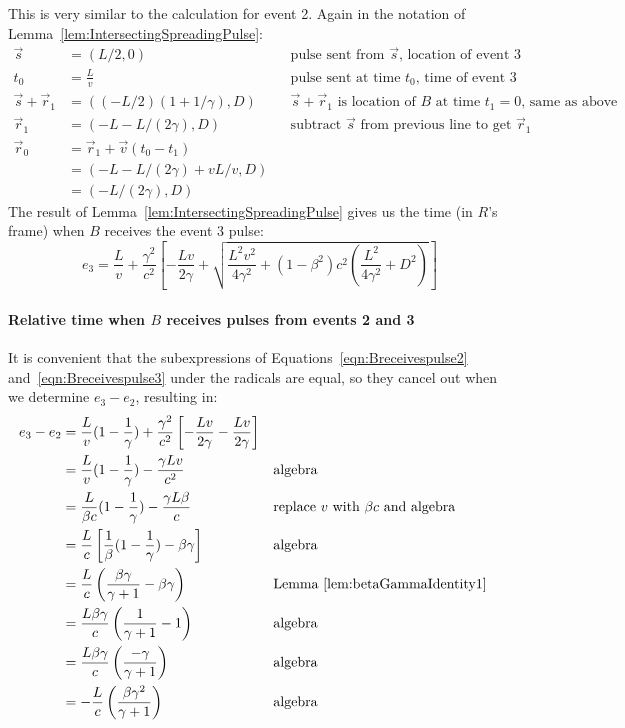 \documentclass[a4paper]{article}
\theoremstyle{plain}
\theoremstyle{definition}
\newcommand{\vect}[1]{\vec{#1}}
\begin{document}
This is very similar to the calculation for event 2.
Again in the notation of Lemma~\ref{lem:IntersectingSpreadingPulse}:
\begin{align*}
\vect{s} & = (L/2, 0) & & \text{pulse sent from $\vect{s}$, location of event 3} \\
t_0 & = \frac{L}{v} & & \text{pulse sent at time $t_0$, time of event 3} \\
\vect{s} + \vect{r}_1 & = ((-L/2)(1+1/\gamma), D) & & \text{$\vect{s}+\vect{r}_1$ is location of $B$ at time $t_1=0$, same as above} \\
\vect{r}_1 & = (-L - L/(2 \gamma), D) & & \text{subtract $\vect{s}$ from previous line to get $\vect{r}_1$} \\
\vect{r}_0 & = \vect{r}_1 + \vect{v}(t_0-t_1) \\
           & = (-L - L/(2 \gamma) + vL/v, D) \\
           & = (-L/(2 \gamma), D)
\end{align*}
The result of Lemma~\ref{lem:IntersectingSpreadingPulse} gives us the
time (in $R$'s frame) when $B$ receives the event 3 pulse:
\begin{equation}
  e_3 = \frac{L}{v} +
        \frac{\gamma^2}{c^2} \left[ -\frac{Lv}{2 \gamma} + \sqrt{ \frac{L^2v^2}{4 \gamma^2} + (1-\beta^2)c^2 (\frac{L^2}{4 \gamma^2} + D^2) } \right]
\label{eqn:Breceivespulse3}
\end{equation}

\paragraph{Relative time when $B$ receives pulses from events 2 and 3}

It is convenient that the subexpressions of
Equations~\eqref{eqn:Breceivespulse2} and~\eqref{eqn:Breceivespulse3}
under the radicals are equal, so they cancel out when we determine
$e_3 - e_2$, resulting in:
\begin{align}
e_3 - e_2
  & = \frac{L}{v}(1-\frac{1}{\gamma}) + \frac{\gamma^2}{c^2} \left[ -\frac{Lv}{2 \gamma} - \frac{Lv}{2 \gamma} \right] \nonumber \\
  & = \frac{L}{v}(1-\frac{1}{\gamma}) - \frac{\gamma Lv}{c^2} & & \text{algebra} \nonumber \\
  & = \frac{L}{\beta c}(1-\frac{1}{\gamma}) - \frac{\gamma L\beta}{c} & & \text{replace $v$ with $\beta c$ and algebra} \nonumber \\
  & = \frac{L}{c} \left[ \frac{1}{\beta}(1-\frac{1}{\gamma}) - \beta \gamma \right] & & \text{algebra} \nonumber \\
  & = \frac{L}{c} \left( \frac{\beta\gamma}{\gamma+1} - \beta \gamma \right) & & \text{Lemma~\ref{lem:betaGammaIdentity1}} \nonumber \\
  & = \frac{L\beta\gamma}{c} \left( \frac{1}{\gamma+1} - 1 \right) & & \text{algebra} \nonumber \\
  & = \frac{L\beta\gamma}{c} \left( \frac{-\gamma}{\gamma+1} \right) & & \text{algebra} \nonumber \\
  & = - \frac{L}{c} \left( \frac{\beta\gamma^2}{\gamma+1} \right) & & \text{algebra} \label{eqn:Bdeltatime3minus2}
\end{align}
\end{document}
